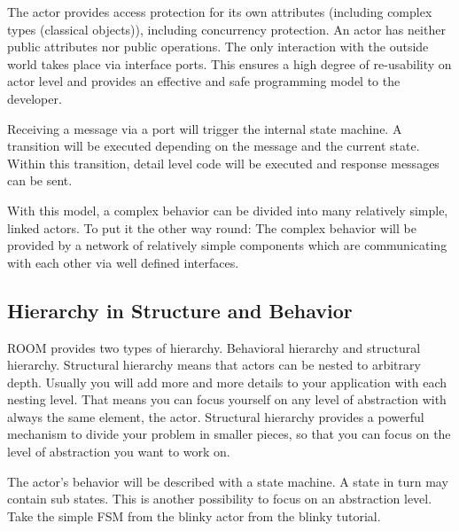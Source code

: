 
The actor provides access protection for its own attributes (including complex types (classical objects)), 
including concurrency protection. An actor has neither public attributes nor public operations. The only 
interaction with the outside world takes place via interface ports. This ensures a high degree of 
re-usability on actor level and provides an effective and safe programming model to the developer. 

Receiving a message via a port will trigger the internal state machine. A transition will be executed 
depending on the message and the current state. Within this transition, detail level code will be executed 
and response messages can be sent.


With this model, a complex behavior can be divided into many relatively simple, linked actors. To put it the 
other way round: The complex behavior will be provided by a network of relatively simple components which 
are communicating with each other via well defined interfaces.


\subsection{Hierarchy in Structure and Behavior}

ROOM provides two types of hierarchy. Behavioral hierarchy and structural hierarchy. Structural hierarchy 
means that actors can be nested to arbitrary depth. Usually you will add more and more details to your 
application with each nesting level. That means you can focus yourself on any level of abstraction with 
always the same element, the actor. Structural hierarchy provides a powerful mechanism to divide your 
problem in smaller pieces, so that you can focus on the level of abstraction you want to work on. 

The actor's behavior will be described with a state machine. A state in turn may contain sub states. This 
is another possibility to focus on an abstraction level. Take the simple FSM from the blinky actor from 
the blinky tutorial. 
   
